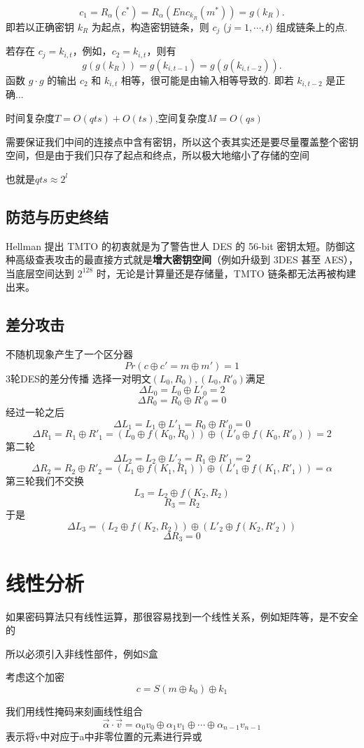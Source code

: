 \documentclass[12pt,a4paper]{article}
\begin{document}
$$c_1 = R_\alpha(c^*) = R_\alpha(Enc_{k_R}(m^*)) = g(k_R).$$
即若以正确密钥 $k_R$ 为起点，构造密钥链条，则 $c_j$ ($j = 1, \cdots, t$) 组成链条上的点.

若存在 $c_j = k_{i,t}$，例如，$c_2 = k_{i,t}$，则有
$$g(g(k_R)) = g(k_{i,t-1}) = g(g(k_{i,t-2})).$$
函数 $g \cdot g$ 的输出 $c_2$ 和 $k_{i,t}$ 相等，很可能是由输入相等导致的. 即若 $k_{i,t-2}$ 是正确...

时间复杂度\(T=O(qts)+O(ts)\),空间复杂度\(M = O(qs)\)

需要保证我们中间的连接点中含有密钥，所以这个表其实还是要尽量覆盖整个密钥空间，但是由于我们只存了起点和终点，所以极大地缩小了存储的空间

也就是\(qts \approx 2^l\)


\subsection{防范与历史终结}
Hellman 提出 TMTO 的初衷就是为了警告世人 DES 的 56-bit 密钥太短。防御这种高级查表攻击的最直接方式就是\textbf{增大密钥空间}（例如升级到 3DES 甚至 AES），当底层空间达到 $2^{128}$ 时，无论是计算量还是存储量，TMTO 链条都无法再被构建出来。

\subsection{差分攻击}
不随机现象产生了一个区分器
\[
Pr(c\oplus c' = m \oplus m') = 1
\]
3轮DES的差分传播
选择一对明文\((L_0,R_0),(L_0,R'_0)\)满足
\[
\Delta L_0 = L_0 \oplus L'_0 = 2 
\]
\[
\Delta R_0 = R_0 \oplus R'_0 = 0 
\]
经过一轮之后
\[
\Delta L_1 = L_1 \oplus L'_1 = R_0 \oplus R'_0 = 0 
\]
\[
\Delta R_1 = R_1 \oplus R'_1 = (L_0 \oplus f(K_0,R_0)) \oplus (L'_0 \oplus f(K_0,R'_0)) = 2
\]
第二轮
\[
\Delta L_2 = L_2 \oplus L'_2 = R_1 \oplus R'_1 = 2
\]
\[
\Delta R_2 = R_2 \oplus R'_2 = (L_1 \oplus f(K_1,R_1)) \oplus (L'_1 \oplus f(K_1,R'_1)) = \alpha
\]
第三轮我们不交换
\[
L_3 = L_2 \oplus f(K_2,R_2)
\]
\[
R_3 = R_2
\]
于是
\[
\Delta L_3 = (L_2 \oplus f(K_2,R_2)) \oplus (L'_2 \oplus f(K_2,R'_2))
\]
\[
\Delta R_3 = 0
\]
\section{线性分析}
如果密码算法只有线性运算，那很容易找到一个线性关系，例如矩阵等，是不安全的

所以必须引入非线性部件，例如S盒

考虑这个加密
\[
c = S(m\oplus k_0) \oplus k_1
\]

我们用线性掩码来刻画线性组合
\[
\vec{\alpha} \cdot \vec{v} =\alpha_0 v_0 \oplus \alpha_1 v_1 \oplus \cdots \oplus \alpha_{n-1} v_{n-1}
\]
表示将v中对应于a中非零位置的元素进行异或
\end{document}
